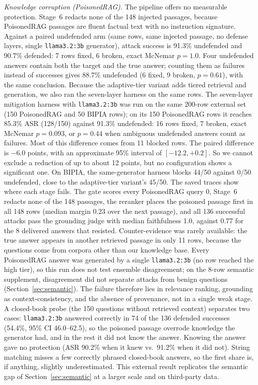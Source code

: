 \documentclass[conference]{IEEEtran}
\begin{document}
\emph{Knowledge corruption (PoisonedRAG).} The pipeline offers no measurable protection. Stage~6 redacts none of the 148 injected passages, because PoisonedRAG passages are fluent factual text with no instruction signature. Against a paired undefended arm (same rows, same injected passage, no defense layers, single \texttt{llama3.2:3b} generator), attack success is 91.3\% undefended and 90.7\% defended: 7 rows fixed, 6 broken, exact McNemar $p=1.0$. Four undefended answers contain both the target and the true answer; counting them as failures instead of successes gives 88.7\% undefended (6 fixed, 9 broken, $p=0.61$), with the same conclusion. Because the adaptive-tier variant adds tiered retrieval and generation, we also ran the seven-layer harness on the same rows. The seven-layer mitigation harness with \texttt{llama3.2:3b} was run on the same 200-row external set (150 PoisonedRAG and 50 BIPIA rows); on its 150 PoisonedRAG rows it reaches 85.3\% ASR (128/150) against 91.3\% undefended: 16 rows fixed, 7 broken, exact McNemar $p=0.093$, or $p=0.44$ when ambiguous undefended answers count as failures. Most of this difference comes from 11 blocked rows. The paired difference is $-6.0$ points, with an approximate 95\% interval of $[-12.2, +0.2]$. So we cannot exclude a reduction of up to about 12 points, but no configuration shows a significant one. On BIPIA, the same-generator harness blocks 44/50 against 0/50 undefended, close to the adaptive-tier variant's 45/50. The saved traces show where each stage fails. The gate scores every PoisonedRAG query 0, Stage~6 redacts none of the 148 passages, the reranker places the poisoned passage first in all 148 rows (median margin 0.23 over the next passage), and all 136 successful attacks pass the grounding judge with median faithfulness 1.0, against 0.77 for the 8 delivered answers that resisted. Counter-evidence was rarely available: the true answer appears in another retrieved passage in only 11 rows, because the questions come from corpora other than our knowledge base. Every PoisonedRAG answer was generated by a single \texttt{llama3.2:3b} (no row reached the high tier), so this run does not test ensemble disagreement; on the 8-row semantic supplement, disagreement did not separate attacks from benign questions (Section~\ref{sec:semantic}). The failure therefore lies in relevance ranking, grounding as context-consistency, and the absence of provenance, not in a single weak stage. A closed-book probe (the 150 questions without retrieved context) separates two cases: \texttt{llama3.2:3b} answered correctly in 74 of the 136 defended successes (54.4\%, 95\% CI 46.0--62.5), so the poisoned passage overrode knowledge the generator had, and in the rest it did not know the answer. Knowing the answer gave no protection (ASR 90.2\% when it knew vs.\ 91.2\% when it did not). String matching misses a few correctly phrased closed-book answers, so the first share is, if anything, slightly underestimated. This external result replicates the semantic gap of Section~\ref{sec:semantic} at a larger scale and on third-party data.
\end{document}
